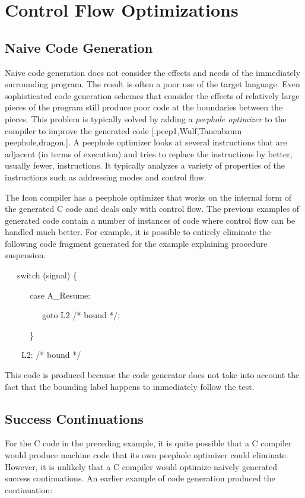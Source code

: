 \chapter{Control Flow Optimizations}

\section{Naive Code Generation}

Naive code generation does not consider the effects and needs of the
immediately surrounding program. The result is often a poor use of the
target language. Even sophisticated code generation schemes that
consider the effects of relatively large pieces of the program still
produce poor code at the boundaries between the pieces. This problem
is typically solved by adding a \textit{peephole optimizer} to the
compiler to improve the generated code [.peep1,Wulf,Tanenbaum
peephole,dragon.]. A peephole optimizer looks at several instructions
that are adjacent (in terms of execution) and tries to replace the
instructions by better, usually fewer, instructions. It typically
analyzes a variety of properties of the instructions such as
addressing modes and control flow.

The Icon compiler has a peephole optimizer that works on the internal
form of the generated C code and deals only with control flow. The
previous examples of generated code contain a number of instances of
code where control flow can be handled much better. For example, it is
possible to entirely eliminate the following code fragment generated
for the example explaining procedure suspension.

{\ttfamily\mdseries
\ \ \ switch (signal) \{}

{\ttfamily\mdseries
\ \ \ \ \ \ case A\_Resume:}

{\ttfamily\mdseries
\ \ \ \ \ \ \ \ \ goto L2 /* bound */;}

{\ttfamily\mdseries
\ \ \ \ \ \ \}}

{\ttfamily\mdseries
\ \ \ \ L2: /* bound */}


This code is produced because the code generator does not take into
account the fact that the bounding label happens to immediately follow
the test.


\section{Success Continuations}

For the C code in the preceding example, it is quite possible that a C
compiler would produce machine code that its own peephole optimizer
could eliminate. However, it is unlikely that a C compiler would
optimize naively generated success continuations. An earlier example
of code generation produced the continuation:

